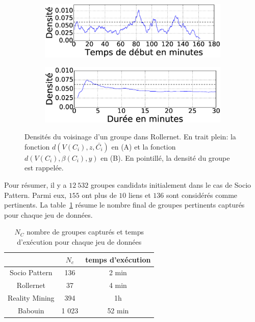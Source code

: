 \begin{figure}
\centering
\begin{subfigure}{0.45\linewidth}
	\includegraphics[width=\linewidth]{img/GroupeDense/GroupExample/Rollernet/vairable_start7}
	\caption{}
	\label{fig:g7_debut}
\end{subfigure}
\begin{subfigure}{0.45\linewidth}
	\includegraphics[width=\linewidth]{img/GroupeDense/GroupExample/Rollernet/vairable_duration7}
	\caption{}
	\label{fig:g7_duree}
\end{subfigure}
\caption{
Densités du voisinage d'un groupe dans Rollernet.
En trait plein: la fonction $d(V(C_i),z,\bar{C_i})$ en (A) et la fonction $d(V(C_i),\beta(C_i),y)$ en (B).
En pointillé, la densité du groupe est rappelée.
}
\label{fig:Rollernet_exemple}
\end{figure}





\bigskip
Pour résumer, il y a $12\ 532$ groupes candidats initialement dans le cas de Socio Pattern.
Parmi eux, $155$ ont plus de $10$ liens et $136$ sont considérés comme pertinents.
La table~\ref{tab:res_exec} résume le nombre final de groupes pertinents capturés pour chaque jeu de données.


\begin{table}
\centering
\begin{tabular}{|c|c|c|}
\hline \rule[-1ex]{0pt}{3.5ex}
 & $N_c$ & temps d'exécution\\
\hline
Socio Pattern & 136 & 2 min\\
Rollernet& 37 & 4 min\\
Reality Mining & 394 & 1h\\
Babouin & 1 023 & 52 min\\
\hline
\end{tabular}
\caption{$N_C$ nombre de groupes capturés et temps d'exécution pour chaque jeu de données}
\label{tab:res_exec}       %
\end{table}


